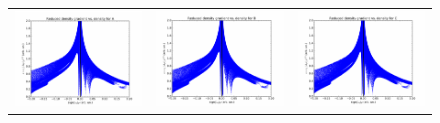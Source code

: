 		
		\begin{figure}[H]
			\begin{center}
				\begin{tabular}{c c c}
					\includegraphics{image/image/P1-F811} & \includegraphics{image/image/P1-F812} & \includegraphics{image/image/P1-F813}\\

\end{tabular}
\end{center}
\end{figure}
